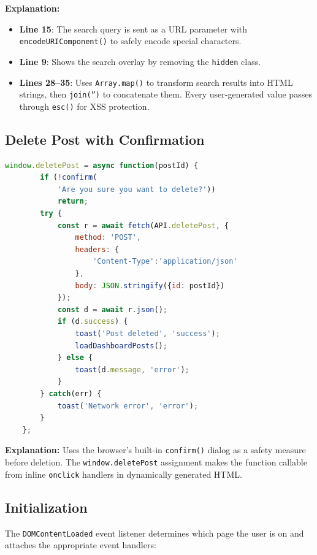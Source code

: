 \documentclass[12pt,a4paper]{report}
\begin{document}
\textbf{Explanation:}
\begin{itemize}
    \item \textbf{Line 15}: The search query is sent as a URL parameter with \texttt{encodeURIComponent()} to safely encode special characters.
    \item \textbf{Line 9}: Shows the search overlay by removing the \texttt{hidden} class.
    \item \textbf{Lines 28--35}: Uses \texttt{Array.map()} to transform search results into HTML strings, then \texttt{join('')} to concatenate them. Every user-generated value passes through \texttt{esc()} for XSS protection.
\end{itemize}

\subsection{Delete Post with Confirmation}

\begin{lstlisting}[language=JavaScript]
    window.deletePost = async function(postId) {
        if (!confirm(
            'Are you sure you want to delete?'))
            return;
        try {
            const r = await fetch(API.deletePost, {
                method: 'POST',
                headers: {
                    'Content-Type':'application/json'
                },
                body: JSON.stringify({id: postId})
            });
            const d = await r.json();
            if (d.success) {
                toast('Post deleted', 'success');
                loadDashboardPosts();
            } else {
                toast(d.message, 'error');
            }
        } catch(err) {
            toast('Network error', 'error');
        }
    };
\end{lstlisting}

\textbf{Explanation:} Uses the browser's built-in \texttt{confirm()} dialog as a safety measure before deletion. The \texttt{window.deletePost} assignment makes the function callable from inline \texttt{onclick} handlers in dynamically generated HTML.

\subsection{Initialization}
The \texttt{DOMContentLoaded} event listener determines which page the user is on and attaches the appropriate event handlers:
\end{document}
